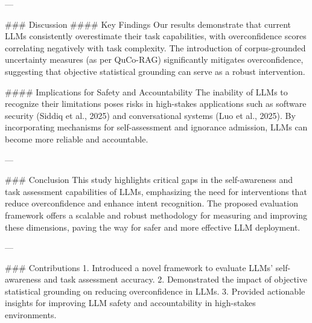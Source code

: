 ---

### Discussion  
#### Key Findings  
Our results demonstrate that current LLMs consistently overestimate their task capabilities, with overconfidence scores correlating negatively with task complexity. The introduction of corpus-grounded uncertainty measures (as per QuCo-RAG) significantly mitigates overconfidence, suggesting that objective statistical grounding can serve as a robust intervention.

#### Implications for Safety and Accountability  
The inability of LLMs to recognize their limitations poses risks in high-stakes applications such as software security (Siddiq et al., 2025) and conversational systems (Luo et al., 2025). By incorporating mechanisms for self-assessment and ignorance admission, LLMs can become more reliable and accountable.

---

### Conclusion  
This study highlights critical gaps in the self-awareness and task assessment capabilities of LLMs, emphasizing the need for interventions that reduce overconfidence and enhance intent recognition. The proposed evaluation framework offers a scalable and robust methodology for measuring and improving these dimensions, paving the way for safer and more effective LLM deployment.

---

### Contributions  
1. Introduced a novel framework to evaluate LLMs' self-awareness and task assessment accuracy.  
2. Demonstrated the impact of objective statistical grounding on reducing overconfidence in LLMs.  
3. Provided actionable insights for improving LLM safety and accountability in high-stakes environments.  